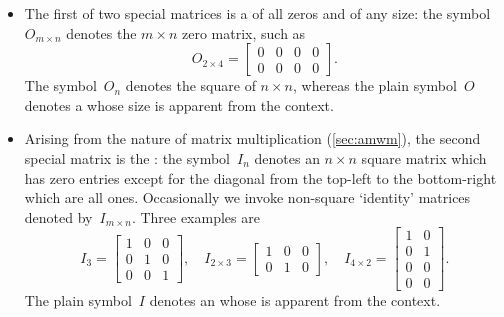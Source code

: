 \begin{itemize}
\item The first of two special matrices is a  of all zeros and of any size: the symbol~\(O_{m\times n}\) denotes the \(m\times n\) zero matrix, such as
\begin{equation*}
O_{2\times 4}=\begin{bmatrix} 0&0&0&0\\0&0&0&0 \end{bmatrix}.
\end{equation*}
The symbol~\(O_n\) denotes the square  of  \(n\times n\), whereas the plain symbol~\(O\) denotes a  whose size is apparent from the context.

\item Arising from the nature of matrix multiplication (\cref{sec:amwm}), the second special matrix is the : the symbol~\(I_n\) denotes an \(n\times n\) square matrix which has zero entries except for the diagonal from the top-left to the bottom-right which are all ones.
Occasionally we invoke non-square `identity' matrices denoted by~\(I_{m\times n}\).
Three examples are
\begin{equation*}
I_3=\begin{bmatrix} 1&0&0\\0&1&0\\0&0&1 \end{bmatrix},\quad
I_{2\times3}=\begin{bmatrix} 1&0&0\\0&1&0\end{bmatrix},\quad
I_{4\times2}=\begin{bmatrix} 1&0\\0&1\\0&0\\0&0\end{bmatrix}.
\end{equation*}
The plain symbol~\(I\) denotes an  whose  is apparent from the context.


\end{itemize}
